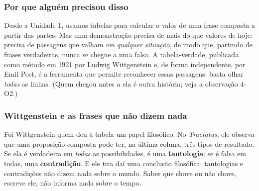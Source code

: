 \DeOndeVem

\subsubsection{Por que alguém precisou disso}
Desde a Unidade 1, usamos tabelas para calcular o valor de uma frase composta a partir das partes. Mas uma demonstração precisa de mais do que valores de hoje: precisa de passagens que valham \emph{em qualquer situação}, de modo que, partindo de frases verdadeiras, nunca se chegue a uma falsa. A tabela-verdade, publicada como método em 1921 por Ludwig Wittgenstein e, de forma independente, por Emil Post, é a ferramenta que permite reconhecer essas passagens: basta olhar \emph{todas} as linhas. (Quem chegou antes a ela é outra história; veja a observação 4-O2.)

\subsubsection{Wittgenstein e as frases que não dizem nada}
Foi Wittgenstein quem deu à tabela um papel filosófico. No \emph{Tractatus}, ele observa que uma proposição composta pode ter, na última coluna, três tipos de resultado. Se ela é verdadeira em \emph{todas} as possibilidades, é uma \textbf{tautologia}; se é falsa em todas, uma \textbf{contradição}. E ele tira daí uma conclusão filosófica: tautologias e contradições não dizem nada sobre o mundo. Saber que chove ou não chove, escreve ele, não informa nada sobre o tempo.

